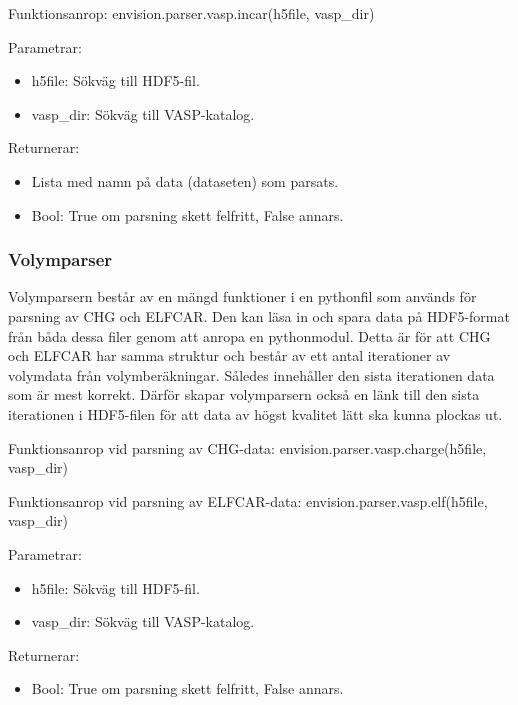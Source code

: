 \documentclass[a4paper,12pt]{article}
\begin{document}
Funktionsanrop: envision.parser.vasp.incar(h5file, vasp\_dir)

Parametrar:
\begin{itemize}
\setlength\itemsep{0em}
\item h5file: Sökväg till HDF5-fil.
\item vasp\_dir: Sökväg till VASP-katalog.
\end{itemize}

Returnerar:
\begin{itemize}
\setlength\itemsep{0em}
\item Lista med namn på data (dataseten) som parsats.
\item Bool: True om parsning skett felfritt, False annars.
\end{itemize}

\subsubsection{Volymparser}
Volymparsern består av en mängd funktioner i en pythonfil som används för parsning av CHG och ELFCAR. Den kan läsa in och spara data på HDF5-format från båda dessa filer genom att anropa en pythonmodul. Detta är för att CHG och ELFCAR har samma struktur och består av ett antal iterationer av volymdata från volymberäkningar. Således innehåller den sista iterationen data som är mest korrekt. Därför skapar volymparsern också en länk till den sista iterationen i HDF5-filen för att data av högst kvalitet lätt ska kunna plockas ut.

Funktionsanrop vid parsning av CHG-data: envision.parser.vasp.charge(h5file, vasp\_dir)

Funktionsanrop vid parsning av ELFCAR-data: envision.parser.vasp.elf(h5file, vasp\_dir)

Parametrar:
\begin{itemize}
\setlength\itemsep{0em}
\item h5file: Sökväg till HDF5-fil.
\item vasp\_dir: Sökväg till VASP-katalog.
\end{itemize}

Returnerar:
\begin{itemize}
\setlength\itemsep{0em}
\item Bool: True om parsning skett felfritt, False annars.
\end{itemize}
\end{document}
